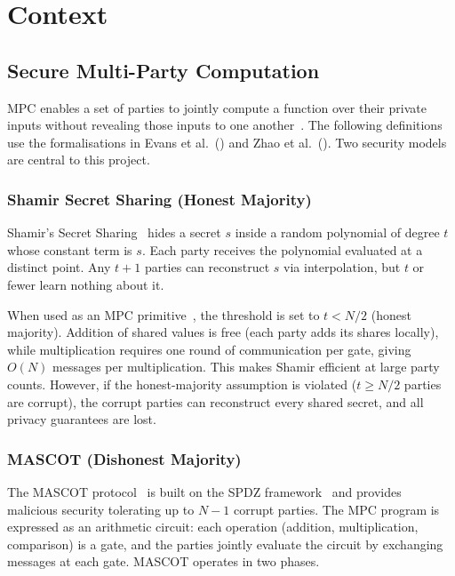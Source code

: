 
\section{Context}
\label{sec:context}

\subsection{Secure Multi-Party Computation}
\label{sec:ctx-mpc}

MPC enables a set of parties to jointly compute a function over their private
inputs without revealing those inputs to one
another~\cite{evans2018_pragmatic_mpc}.  The following definitions use the
formalisations in Evans et al.~(\citeyear{evans2018_pragmatic_mpc}) and
Zhao et al.~(\citeyear{zhao2019_secure_mpc}).  Two security models are central
to this project.

\subsubsection{Shamir Secret Sharing (Honest Majority)}
\label{sec:ctx-shamir}

Shamir's Secret Sharing~\cite{shamir1979_secret_sharing} hides a secret $s$
inside a random polynomial of degree $t$ whose constant term is $s$.  Each
party receives the polynomial evaluated at a distinct point.  Any $t{+}1$
parties can reconstruct $s$ via interpolation, but $t$ or fewer learn nothing
about it.

When used as an MPC primitive~\cite{evans2018_pragmatic_mpc}, the threshold
is set to $t < N/2$ (honest majority).  Addition of shared values is free
(each party adds its shares locally), while multiplication requires one
round of communication per gate, giving $O(N)$ messages per multiplication.
This makes Shamir efficient at large party counts.  However, if the
honest-majority assumption is violated ($t \geq N/2$ parties are corrupt),
the corrupt parties can reconstruct every shared secret, and all privacy
guarantees are lost.

\subsubsection{MASCOT (Dishonest Majority)}
\label{sec:ctx-mascot}

The MASCOT protocol~\cite{keller2016_mascot} is built on the SPDZ
framework~\cite{damgaard2011_spdz} and provides malicious security tolerating
up to $N{-}1$ corrupt parties.  The MPC program is expressed as an arithmetic
circuit: each operation (addition, multiplication, comparison) is a gate, and
the parties jointly evaluate the circuit by exchanging messages at each gate.
MASCOT operates in two phases.

